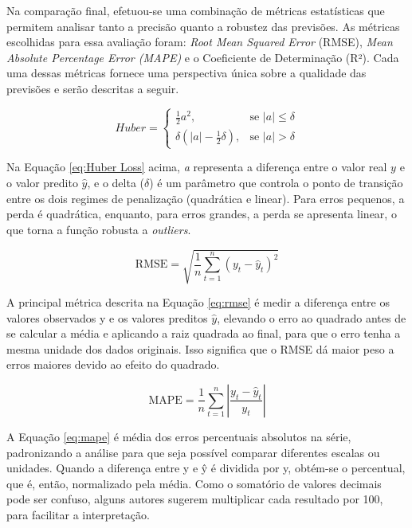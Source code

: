 Na comparação final, efetuou-se uma combinação de métricas estatísticas 
que permitem analisar tanto a precisão quanto a robustez das previsões.
As métricas escolhidas para essa avaliação foram: 
\textit{Root Mean Squared Error} (RMSE), \textit{Mean Absolute Percentage Error (MAPE)} e o Coeficiente de Determinação (R²). Cada uma dessas métricas fornece uma perspectiva única sobre a qualidade das previsões e serão descritas a seguir.

\begin{equation}
Huber = 
\begin{cases} 
\frac{1}{2} a^2, & \text{se } |a| \leq \delta \\
\delta (|a| - \frac{1}{2} \delta), & \text{se } |a| > \delta 
\end{cases}
\label{eq:Huber Loss}
\end{equation}

Na Equação \ref{eq:Huber Loss} acima, \textit{a} representa a diferença entre o valor real $y$ e o valor predito  $\hat{y}$, e o delta ($  \delta $) é um parâmetro que controla o ponto de transição entre os dois regimes de penalização (quadrática e linear). Para erros pequenos, a perda é quadrática, enquanto, para erros grandes, a perda se apresenta linear, o que torna a função robusta a \textit{outliers}.

\begin{equation}
    \text{RMSE} = \sqrt{\frac{1}{n} \sum_{t=1}^{n} (y_t - \hat{y}_t)^2}
    \label{eq:rmse}
\end{equation}

A principal métrica descrita na Equação \ref{eq:rmse} é medir a diferença entre os valores observados 
y e os valores preditos $\hat{y}$, elevando o erro ao quadrado antes de se calcular a média e aplicando a raiz quadrada ao final, para que o erro tenha a mesma unidade dos dados originais. Isso significa que o RMSE dá maior peso a erros maiores devido ao efeito do quadrado.

\begin{equation}
    \text{MAPE} = \frac{1}{n} \sum_{t=1}^{n} \left|\frac{y_t - \hat{y}_t}{y_t}\right|
    \label{eq:mape}
\end{equation}

A Equação \ref{eq:mape} é média dos erros percentuais absolutos na série, padronizando a análise para que seja possível comparar diferentes escalas ou unidades.
Quando a diferença entre y e ŷ é dividida por y, obtém-se o percentual, que é, então, normalizado pela média. Como o somatório de valores decimais pode ser confuso, alguns autores sugerem multiplicar cada resultado por 100, para facilitar a interpretação.

